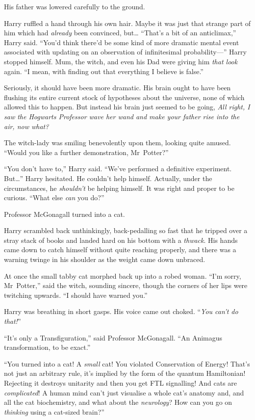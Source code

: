 His father was lowered carefully to the ground.

Harry ruffled a hand through his own hair. Maybe it was just that strange part of him which had \emph{already} been convinced, but… “That’s a bit of an anticlimax,” Harry said. “You’d think there’d be some kind of more dramatic mental event associated with updating on an observation of infinitesimal probability—” Harry stopped himself. Mum, the witch, and even his Dad were giving him \emph{that look} again. “I mean, with finding out that everything I believe is false.”

Seriously, it should have been more dramatic. His brain ought to have been flushing its entire current stock of hypotheses about the universe, none of which allowed this to happen. But instead his brain just seemed to be going, \emph{All right, I saw the Hogwarts Professor wave her wand and make your father rise into the air, now what?}

The witch-lady was smiling benevolently upon them, looking quite amused. “Would you like a further demonstration, Mr~Potter?”

“You don’t have to,” Harry said. “We’ve performed a definitive experiment. But…” Harry hesitated. He couldn’t help himself. Actually, under the circumstances, he \emph{shouldn’t} be helping himself. It was right and proper to be curious. “What else \emph{can} you do?”

Professor McGonagall turned into a cat.

Harry scrambled back unthinkingly, back-pedalling so fast that he tripped over a stray stack of books and landed hard on his bottom with a \emph{thwack}. His hands came down to catch himself without quite reaching properly, and there was a warning twinge in his shoulder as the weight came down unbraced.

At once the small tabby cat morphed back up into a robed woman. “I’m sorry, Mr~Potter,” said the witch, sounding sincere, though the corners of her lips were twitching upwards. “I should have warned you.”

Harry was breathing in short gasps. His voice came out choked. “\emph{You can’t \emph{do} that!}”

“It’s only a Transfiguration,” said Professor McGonagall. “An Animagus transformation, to be exact.”

“You turned into a cat! A \emph{small} cat! You violated Conservation of Energy! That’s not just an arbitrary rule, it’s implied by the form of the quantum Hamiltonian! Rejecting it destroys unitarity and then you get FTL signalling! And cats are \emph{complicated}! A human mind can’t just visualise a whole cat’s anatomy and, and all the cat biochemistry, and what about the \emph{neurology}? How can you go on \emph{thinking} using a cat-sized brain?”

